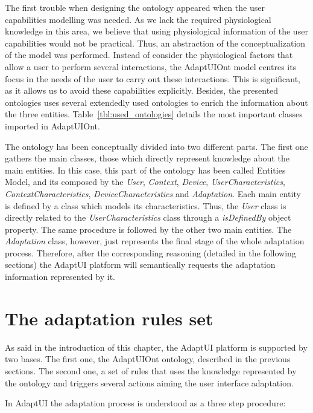 The first trouble when designing the ontology appeared when the user capabilities
modelling was needed. As we lack the required physiological knowledge in this area,
we believe that using physiological information of the user capabilities would
not be practical. Thus, an abstraction of the conceptualization of the model was
performed. Instead of consider the physiological factors that allow a user to
perform several interactions, the AdaptUIOnt model centres its focus in the needs
of the user to carry out these interactions. This is significant, as it allows
us to avoid these capabilities explicitly. Besides, the presented ontologies
uses several extendedly used ontologies to enrich the information about the three
entities. Table~\ref{tbl:used_ontologies} details the most important classes
imported in AdaptUIOnt.

The ontology has been conceptually divided into two different parts. The first
one gathers the main classes, those which directly represent knowledge about
the main entities. In this case, this part of the ontology has been called
Entities Model, and its composed by the \textit{User}, \textit{Context},
\textit{Device}, \textit{UserCharacteristics}, \textit{ContextCharacteristics},
\textit{DeviceCharacteristics} and \textit{Adaptation}. Each main entity is
defined by a class which models its characteristics. Thus, the \textit{User}
class is directly related to the \textit{UserCharacteristics} class through a
\textit{isDefinedBy} object property. The same procedure is followed by the other
two main entities. The \textit{Adaptation} class, however, just represents the
final stage of the whole adaptation process. Therefore, after the corresponding
reasoning (detailed in the following sections) the AdaptUI platform will
semantically requests the adaptation information represented by it.



\section{The adaptation rules set}
\label{sec:adaptui_rules}

As said in the introduction of this chapter, the AdaptUI platform is supported
by two bases. The first one, the AdaptUIOnt ontology, described in the previous
sections. The second one, a set of rules that uses the knowledge represented
by the ontology and triggers several actions aiming the user interface adaptation.


In AdaptUI the adaptation process is understood as a three step procedure: 

